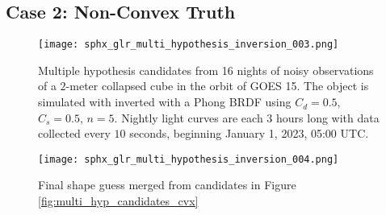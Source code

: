 \subsection{Case 2: Non-Convex Truth}

\begin{figure}[!htb]
  \centering
  \texttt{[image: sphx\_glr\_multi\_hypothesis\_inversion\_003.png]}
  \caption{Multiple hypothesis candidates from 16 nights of noisy observations of a $2$-meter collapsed cube in the orbit of GOES 15. The object is simulated with inverted with a Phong BRDF using $C_d=0.5$, $C_s=0.5$, $n=5$. Nightly light curves are each $3$ hours long with data collected every $10$ seconds, beginning January 1, 2023, 05:00 UTC.}
  \label{fig:multi_hyp_candidates_ncvx}
\end{figure}

\begin{figure}[!htb]
\centering
\texttt{[image: sphx\_glr\_multi\_hypothesis\_inversion\_004.png]}
\caption{Final shape guess merged from candidates in Figure \ref{fig:multi_hyp_candidates_cvx}}
\label{fig:multi_hyp_final_ncvx}
\end{figure}
